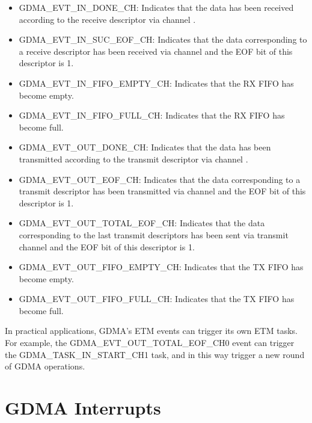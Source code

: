 \documentclass[main\_\_EN.tex]{subfiles}
\begin{document}
\begin{itemize}
    \item GDMA\_EVT\_IN\_DONE\_CH: Indicates that the data has been received according to the receive descriptor via channel .
    \item GDMA\_EVT\_IN\_SUC\_EOF\_CH: Indicates that the data corresponding to a receive descriptor has been received via channel  and the EOF bit of this descriptor is 1.
    \item GDMA\_EVT\_IN\_FIFO\_EMPTY\_CH: Indicates that the RX FIFO has become empty.
    \item GDMA\_EVT\_IN\_FIFO\_FULL\_CH: Indicates that the RX FIFO has become full.
    \item GDMA\_EVT\_OUT\_DONE\_CH: Indicates that the data has been transmitted according to the transmit descriptor via channel .
    \item GDMA\_EVT\_OUT\_EOF\_CH: Indicates that the data corresponding to a transmit descriptor has been transmitted via channel  and the EOF bit of this descriptor is 1.
    \item GDMA\_EVT\_OUT\_TOTAL\_EOF\_CH: Indicates that the data corresponding to the last transmit descriptors has been sent via transmit channel  and the EOF bit of this descriptor is 1.
    \item GDMA\_EVT\_OUT\_FIFO\_EMPTY\_CH: Indicates that the TX FIFO has become empty.
    \item GDMA\_EVT\_OUT\_FIFO\_FULL\_CH: Indicates that the TX FIFO has become full.
\end{itemize}

In practical applications, GDMA's ETM events can trigger its own ETM tasks. For example, the GDMA\_EVT\_OUT\_TOTAL\_EOF\_CH0 event can trigger the GDMA\_TASK\_IN\_START\_CH1 task, and in this way trigger a new round of GDMA operations.


\section{GDMA Interrupts}
\end{document}
